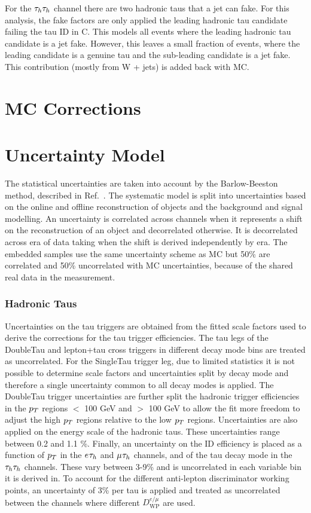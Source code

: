 For the $\tau_{h}\tau_{h}$ channel there are two hadronic taus that a jet can fake.
For this analysis, the fake factors are only applied the leading hadronic tau candidate failing the tau ID in C.
This models all events where the leading hadronic tau candidate is a jet fake.
However, this leaves a small fraction of events, where the leading candidate is a genuine tau and the sub-leading candidate is a jet fake.
This contribution (mostly from W + jets) is added back with MC.

\newpage
\section{MC Corrections}

\newpage
\section{Uncertainty Model}
\label{sec:uncerts}

The statistical uncertainties are taken into account by the Barlow-Beeston method, described in Ref.~\cite{}.
The systematic model is split into uncertainties based on the online and offline reconstruction of objects and the background and signal modelling.
An uncertainty is correlated across channels when it represents a shift on the reconstruction of an object and decorrelated otherwise.
It is decorrelated across era of data taking when the shift is derived independently by era.
The embedded samples use the same uncertainty scheme as MC but 50\% are correlated and 50\% uncorrelated with MC uncertainties, because of the shared real data in the measurement.

\subsubsection{Hadronic Taus}
Uncertainties on the tau triggers are obtained from the fitted scale factors used to derive the corrections for the tau trigger efficiencies.
The tau legs of the DoubleTau and lepton+tau cross triggers in different decay mode bins are treated as uncorrelated.
For the SingleTau trigger leg, due to limited statistics it is not possible to determine scale factors and uncertainties split by decay mode and therefore a single uncertainty common to all decay modes is applied.
The DoubleTau trigger uncertainties are further split the hadronic trigger efficiencies in the $p_{T}$ regions $<$ 100 GeV and $>$ 100 GeV to allow the fit more freedom to adjust the high $p_{T}$ regions relative to the low $p_{T}$ regions.
Uncertainties are also applied on the energy scale of the hadronic taus. 
These uncertainties range between 0.2 and 1.1 \%. 
Finally, an uncertainty on the ID efficiency is placed as a function of $p_{T}$ in the $e_{}\tau_{h}$ and $\mu_{}\tau_{h}$ channels, and of the tau decay mode in the $\tau_{h}\tau_{h}$ channels. 
These vary between 3-9\% and is uncorrelated in each variable bin it is derived in.
To account for the different anti-lepton discriminator working points, an uncertainty of 3\% per tau is applied and treated as uncorrelated between the channels where different $D_{\text{WP}}^{e/\mu}$ are used.

